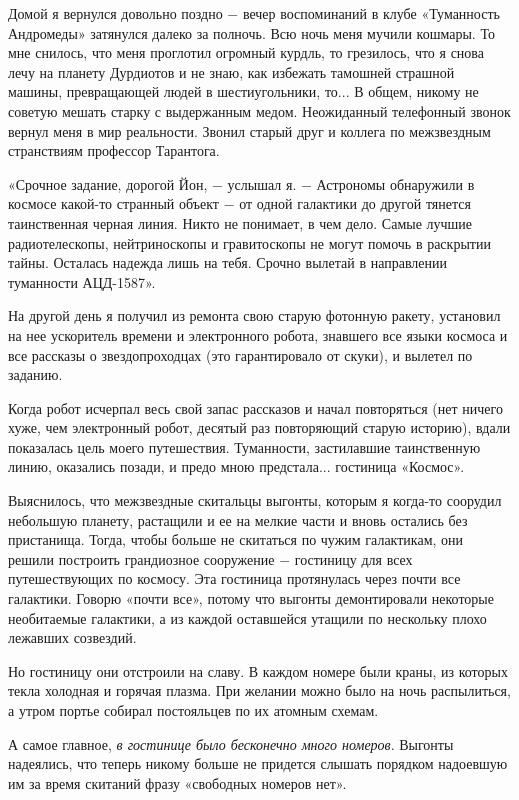 \documentclass{article}
\begin{document}
Домой я вернулся довольно поздно \(-\) вечер воспоминаний в клубе «Туманность Андромеды» затянулся далеко за полночь. Всю ночь меня мучили кошмары. То мне снилось, что меня проглотил огромный курдль, то грезилось, что я снова лечу на планету Дурдиотов и не знаю, как избежать тамошней страшной машины, превращающей людей в шестиугольники, то... В общем, никому не советую мешать старку с выдержанным медом. Неожиданный телефонный звонок вернул меня в мир реальности. Звонил старый друг и коллега по межзвездным странствиям профессор Тарантога.

«Срочное задание, дорогой Йон, \(-\) услышал я. \(-\) Астрономы обнаружили в космосе какой-то странный объект \(-\) от одной галактики до другой тянется таинственная черная линия. Никто не понимает, в чем дело. Самые лучшие радиотелескопы, нейтриноскопы и гравитоскопы не могут помочь в раскрытии тайны. Осталась надежда лишь на тебя. Срочно вылетай в направлении туманности АЦД-1587».

На другой день я получил из ремонта свою старую фотонную ракету, установил на нее ускоритель времени и электронного робота, знавшего все языки космоса и все рассказы о звездопроходцах (это гарантировало от скуки), и вылетел по заданию.

Когда робот исчерпал весь свой запас рассказов и начал повторяться (нет ничего хуже, чем электронный робот, десятый раз повторяющий старую историю), вдали показалась цель моего путешествия. Туманности, застилавшие таинственную линию, оказались позади, и предо мною предстала... гостиница «Космос».

Выяснилось, что межзвездные скитальцы выгонты, которым я когда-то соорудил небольшую планету, растащили и ее на мелкие части и вновь остались без пристанища. Тогда, чтобы больше не скитаться по чужим галактикам, они решили построить грандиозное сооружение \(-\) гостиницу для всех путешествующих по космосу. Эта гостиница протянулась через почти все галактики. Говорю «почти
все», потому что выгонты демонтировали некоторые необитаемые галактики, а из каждой оставшейся утащили по нескольку плохо лежавших созвездий.

Но гостиницу они отстроили на славу. В каждом номере были краны, из которых текла холодная и горячая плазма. При желании можно было на ночь распылиться, а утром портье собирал постояльцев по их атомным схемам.

А самое главное, \textit{в гостинице было бесконечно много номеров}. Выгонты надеялись, что теперь никому больше не придется слышать порядком надоевшую им за время скитаний фразу «свободных номеров нет».
\end{document}
